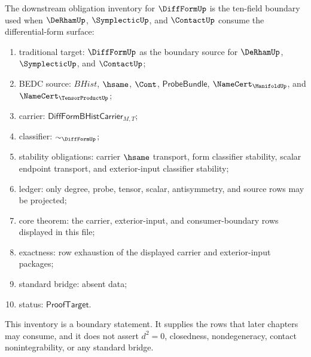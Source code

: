 \begin{definition}
\label{def:diffform-downstream-obligation-inventory}
The downstream obligation inventory for $\DiffFormUp$ is the ten-field
boundary used when $\DeRhamUp$, $\SymplecticUp$, and $\ContactUp$ consume the
differential-form surface:
\begin{enumerate}
  \item traditional target: $\DiffFormUp$ as the boundary source for
  $\DeRhamUp$, $\SymplecticUp$, and $\ContactUp$;
  \item BEDC source: $BHist$, $\hsame$, $\Cont$,
  $\mathsf{ProbeBundle}$, $\NameCert_{\ManifoldUp}$, and
  $\NameCert_{\TensorProductUp}$;
  \item carrier: $\mathsf{DiffFormBHistCarrier}_{M,T}$;
  \item classifier: $\sim_{\DiffFormUp}$;
  \item stability obligations: carrier $\hsame$ transport, form classifier
  stability, scalar endpoint transport, and exterior-input classifier
  stability;
  \item ledger: only degree, probe, tensor, scalar, antisymmetry, and source
  rows may be projected;
  \item core theorem: the carrier, exterior-input, and consumer-boundary rows
  displayed in this file;
  \item exactness: row exhaustion of the displayed carrier and
  exterior-input packages;
  \item standard bridge: absent data;
  \item status: $\mathsf{ProofTarget}$.
\end{enumerate}
This inventory is a boundary statement. It supplies the rows that later
chapters may consume, and it does not assert $d^2=0$, closedness,
nondegeneracy, contact nonintegrability, or any standard bridge.
\end{definition}

